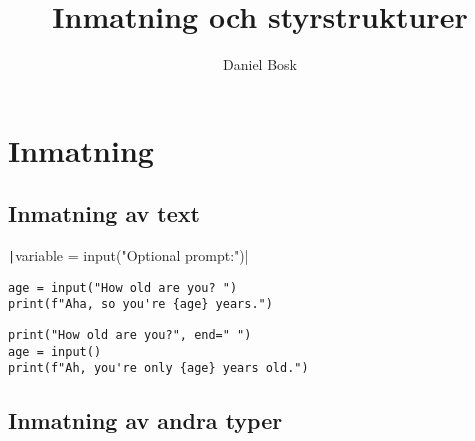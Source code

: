 \title{%
  Inmatning och styrstrukturer
}
\author{Daniel Bosk}


\mode*

\begin{abstract}
  
\end{abstract}


\section{Inmatning}

\subsection{Inmatning av text}

\begin{frame}
  \begin{center}
    \texttt|variable = input("Optional prompt:")|
  \end{center}
\end{frame}

\begin{frame}[fragile]
  \begin{example}
    \begin{verbatim}
age = input("How old are you? ")
print(f"Aha, so you're {age} years.")
    \end{verbatim}
  \end{example}

  \pause

  \begin{example}
    \begin{verbatim}
print("How old are you?", end=" ")
age = input()
print(f"Ah, you're only {age} years old.")
    \end{verbatim}
  \end{example}
\end{frame}

\subsection{Inmatning av andra typer}

